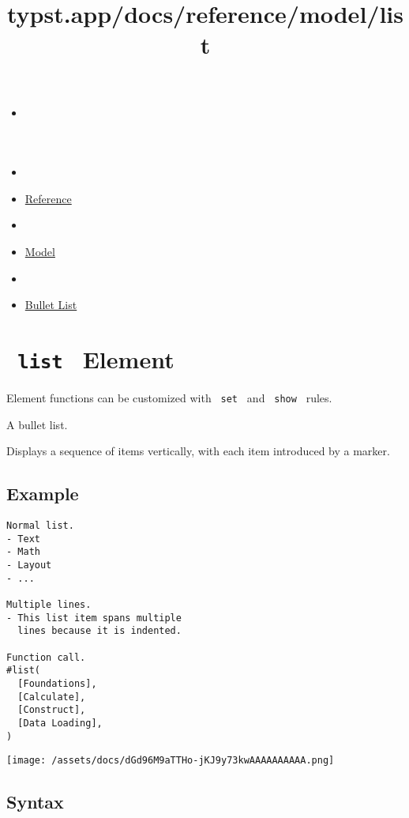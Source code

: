 \title{typst.app/docs/reference/model/list}

\begin{itemize}
\tightlist
\item
  \href{/docs}{}
\item
  
\item
  \href{/docs/reference/}{Reference}
\item
  
\item
  \href{/docs/reference/model/}{Model}
\item
  
\item
  \href{/docs/reference/model/list/}{Bullet List}
\end{itemize}

\section{\texorpdfstring{\texttt{\ list\ } {{ Element
}}}{ list   Element }}\label{summary}

\label{element-tooltip}
Element functions can be customized with \texttt{\ set\ } and
\texttt{\ show\ } rules.

A bullet list.

Displays a sequence of items vertically, with each item introduced by a
marker.

\subsection{Example}\label{example}

\begin{verbatim}
Normal list.
- Text
- Math
- Layout
- ...

Multiple lines.
- This list item spans multiple
  lines because it is indented.

Function call.
#list(
  [Foundations],
  [Calculate],
  [Construct],
  [Data Loading],
)
\end{verbatim}

\texttt{[image: /assets/docs/dGd96M9aTTHo-jKJ9y73kwAAAAAAAAAA.png]}

\subsection{Syntax}\label{syntax}

